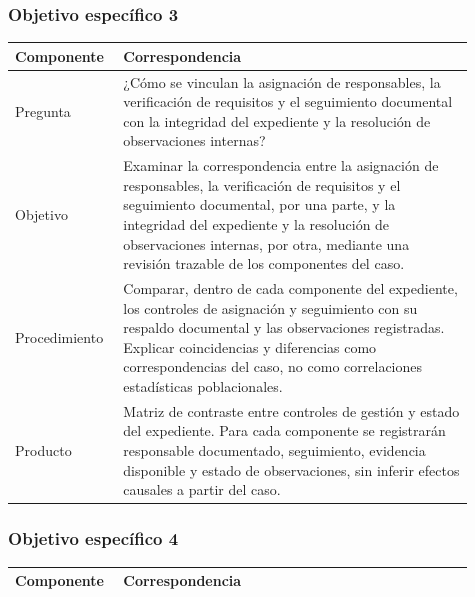 {\begin{longtable}{p{0.19\linewidth}p{0.72\linewidth}}
\end{longtable}

\subsubsection{Objetivo específico 3}

\begin{longtable}{p{0.19\linewidth}p{0.72\linewidth}}

\textbf{Componente} & \textbf{Correspondencia} \\ \hline\endhead

Pregunta & ¿Cómo se vinculan la asignación de responsables, la verificación de requisitos y el seguimiento documental con la integridad del expediente y la resolución de observaciones internas? \\ \hline

Objetivo & Examinar la correspondencia entre la asignación de responsables, la verificación de requisitos y el seguimiento documental, por una parte, y la integridad del expediente y la resolución de observaciones internas, por otra, mediante una revisión trazable de los componentes del caso. \\ \hline

Procedimiento & Comparar, dentro de cada componente del expediente, los controles de asignación y seguimiento con su respaldo documental y las observaciones registradas. Explicar coincidencias y diferencias como correspondencias del caso, no como correlaciones estadísticas poblacionales. \\ \hline

Producto & Matriz de contraste entre controles de gestión y estado del expediente. Para cada componente se registrarán responsable documentado, seguimiento, evidencia disponible y estado de observaciones, sin inferir efectos causales a partir del caso. \\ \hline

\end{longtable}

\subsubsection{Objetivo específico 4}

\begin{longtable}{p{0.19\linewidth}p{0.72\linewidth}}

\textbf{Componente} & \textbf{Correspondencia} \\ \hline\endhead


\end{longtable}}
